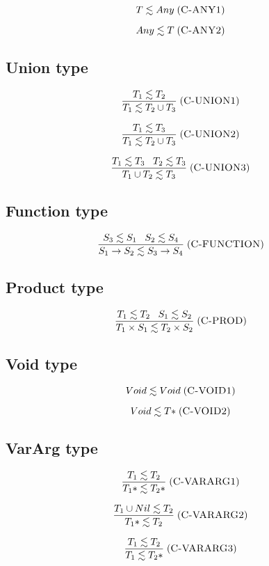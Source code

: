 \documentclass[12pt]{article}
\newcommand{\mylabel}[1]{\; (\textsc{#1})}
\begin{document}
\[
T \lesssim Any
\mylabel{C-ANY1}
\]

\[
Any \lesssim T
\mylabel{C-ANY2}
\]

\subsection{Union type}

\[
\frac{T_{1} \lesssim T_{2}}
     {T_{1} \lesssim T_{2} \cup T_{3}}
\mylabel{C-UNION1}
\]

\[
\frac{T_{1} \lesssim T_{3}}
     {T_{1} \lesssim T_{2} \cup T_{3}}
\mylabel{C-UNION2}
\]

\[
\frac{T_{1} \lesssim T_{3} \;\;\; T_{2} \lesssim T_{3}}
     {T_{1} \cup T_{2} \lesssim T_{3}}
\mylabel{C-UNION3}
\]

\subsection{Function type}

\[
\frac{S_{3} \lesssim S_{1} \;\;\; S_{2} \lesssim S_{4}}
     {S_{1} \rightarrow S_{2} \lesssim S_{3} \rightarrow S_{4}}
\mylabel{C-FUNCTION}
\]

\subsection{Product type}

\[
\frac{T_{1} \lesssim T_{2} \;\;\; S_{1} \lesssim S_{2}}
     {T_{1} \times S_{1} \lesssim T_{2} \times S_{2}}
\mylabel{C-PROD}
\]

\subsection{Void type}

\[
Void \lesssim Void
\mylabel{C-VOID1}
\]

\[
Void \lesssim {T*}
\mylabel{C-VOID2}
\]

\subsection{VarArg type}

\[
\frac{T_{1} \lesssim T_{2}}
     {{T_{1}*} \lesssim {T_{2}*}}
\mylabel{C-VARARG1}
\]

\[
\frac{T_{1} \cup Nil \lesssim T_{2}}
     {{T_{1}*} \lesssim T_{2}}
\mylabel{C-VARARG2}
\]

\[
\frac{T_{1} \lesssim T_{2}}
     {T_{1} \lesssim {T_{2}*}}
\mylabel{C-VARARG3}
\]
\end{document}
